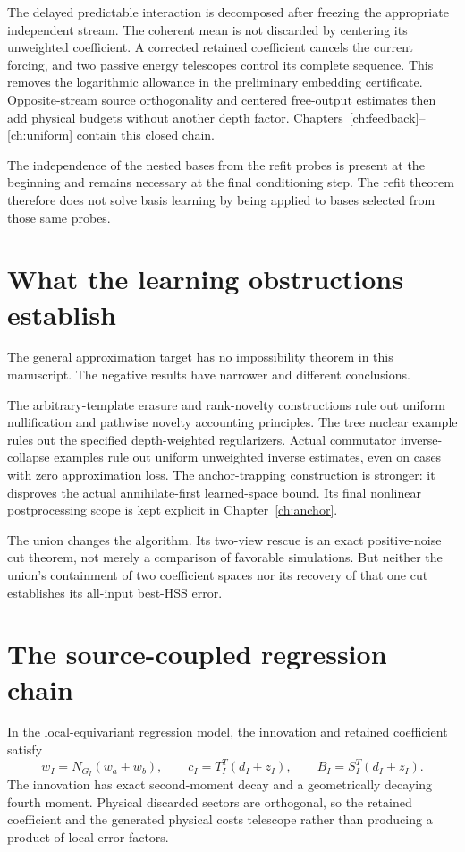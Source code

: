 \documentclass[11pt,oneside,openany,a4paper]{book}
\numberwithin{equation}{chapter}
\theoremstyle{definition}
\theoremstyle{remark}
\begin{document}
The delayed predictable interaction is decomposed after freezing the appropriate independent stream. The coherent mean is not discarded by centering its unweighted coefficient. A corrected retained coefficient cancels the current forcing, and two passive energy telescopes control its complete sequence. This removes the logarithmic allowance in the preliminary embedding certificate. Opposite-stream source orthogonality and centered free-output estimates then add physical budgets without another depth factor. Chapters~\ref{ch:feedback}--\ref{ch:uniform} contain this closed chain.

The independence of the nested bases from the refit probes is present at the beginning and remains necessary at the final conditioning step. The refit theorem therefore does not solve basis learning by being applied to bases selected from those same probes.

\section{What the learning obstructions establish}
The general approximation target has no impossibility theorem in this manuscript. The negative results have narrower and different conclusions.

The arbitrary-template erasure and rank-novelty constructions rule out uniform nullification and pathwise novelty accounting principles. The tree nuclear example rules out the specified depth-weighted regularizers. Actual commutator inverse-collapse examples rule out uniform unweighted inverse estimates, even on cases with zero approximation loss. The anchor-trapping construction is stronger: it disproves the actual annihilate-first learned-space bound. Its final nonlinear postprocessing scope is kept explicit in Chapter~\ref{ch:anchor}.

The union changes the algorithm. Its two-view rescue is an exact positive-noise cut theorem, not merely a comparison of favorable simulations. But neither the union's containment of two coefficient spaces nor its recovery of that one cut establishes its all-input best-HSS error.

\section{The source-coupled regression chain}
In the local-equivariant regression model, the innovation and retained coefficient satisfy
\[
 w_I=N_{G_I}(w_a+w_b),\qquad
 c_I=T_I^T(d_I+z_I),\qquad
 B_I=S_I^T(d_I+z_I).
\]
The innovation has exact second-moment decay and a geometrically decaying fourth moment. Physical discarded sectors are orthogonal, so the retained coefficient and the generated physical costs telescope rather than producing a product of local error factors.
\end{document}
